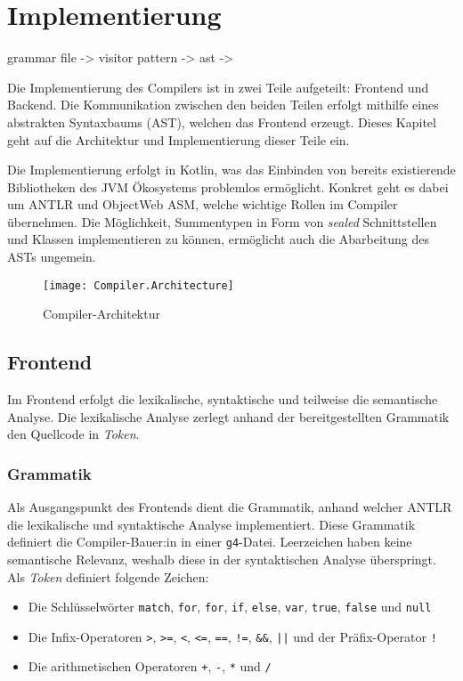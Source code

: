 \chapter{Implementierung}
\label{cha:implementation}


grammar file -> visitor pattern -> ast ->

Die Implementierung des Compilers ist in zwei Teile aufgeteilt: Frontend und Backend. Die Kommunikation zwischen den beiden Teilen erfolgt mithilfe eines abstrakten Syntaxbaums (AST), welchen das Frontend erzeugt. Dieses Kapitel geht  auf die Architektur und Implementierung dieser Teile ein.

Die Implementierung erfolgt in Kotlin, was das Einbinden von bereits existierende Bibliotheken des JVM Ökosystems problemlos ermöglicht. Konkret geht es dabei um ANTLR und ObjectWeb ASM, welche wichtige Rollen im Compiler übernehmen. Die Möglichkeit, Summentypen in Form von \textit{sealed} Schnittstellen und Klassen implementieren zu können, ermöglicht auch die Abarbeitung des ASTs ungemein.

\begin{figure}[h]
    \caption{Compiler-Architektur}
    \centering
    \texttt{[image: Compiler.Architecture]}
    \label{fig:ibm360}
\end{figure}

\section{Frontend}

Im Frontend erfolgt die lexikalische, syntaktische und teilweise die semantische Analyse. Die lexikalische Analyse zerlegt anhand der bereitgestellten Grammatik den Quellcode in \textit{Token}.

\subsection{Grammatik}

Als Ausgangspunkt des Frontends dient die Grammatik, anhand welcher ANTLR die lexikalische und syntaktische Analyse implementiert. Diese Grammatik definiert die Compiler-Bauer:in in einer \texttt{g4}-Datei. Leerzeichen haben keine semantische Relevanz, weshalb \toya diese in der syntaktischen Analyse überspringt. Als \textit{Token} definiert \toya folgende Zeichen:

\begin{itemize}
    \item Die Schlüsselwörter \texttt{match}, \texttt{for}, \texttt{for}, \texttt{if}, \texttt{else}, \texttt{var}, \texttt{true}, \texttt{false} und \texttt{null}
    \item Die Infix-Operatoren \texttt{>}, \texttt{>=}, \texttt{<}, \texttt{<=}, \texttt{==}, \texttt{!=}, \texttt{\&\&}, \texttt{||} und der Präfix-Operator \texttt{!}
    \item Die arithmetischen Operatoren \texttt{+}, \texttt{-}, \texttt{*} und \texttt{/}
\end{itemize}


